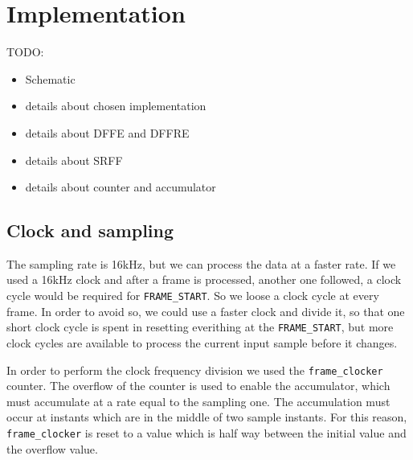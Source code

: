 \section{Implementation}
TODO:

\begin{itemize}
  \item Schematic
  \item details about chosen implementation
  \item details about DFFE and DFFRE
  \item details about SRFF
  \item details about counter and accumulator
\end{itemize}

\subsection{Clock and sampling}
The sampling rate is 16\si{\kilo\hertz}, but we can process the data at a faster
rate. If we used a 16\si{\kilo\hertz} clock and after a frame is processed,
another one followed, a clock cycle would be required for \texttt{FRAME\_START}.
So we loose a clock cycle at every frame. In order to avoid so, we could use a
faster clock and divide it, so that one short clock cycle is spent in resetting
everithing at the \texttt{FRAME\_START}, but more clock cycles are
available to process the current input sample before it changes.

In order to perform the clock frequency division we used the
\texttt{frame\_clocker} counter.
The overflow of the counter is used to enable the accumulator, which must
accumulate at a rate equal to the sampling one.
The accumulation must occur at instants which are in the middle of two sample
instants. For this reason, \texttt{frame\_clocker} is reset to a value which is
half way between the initial value and the overflow value.
